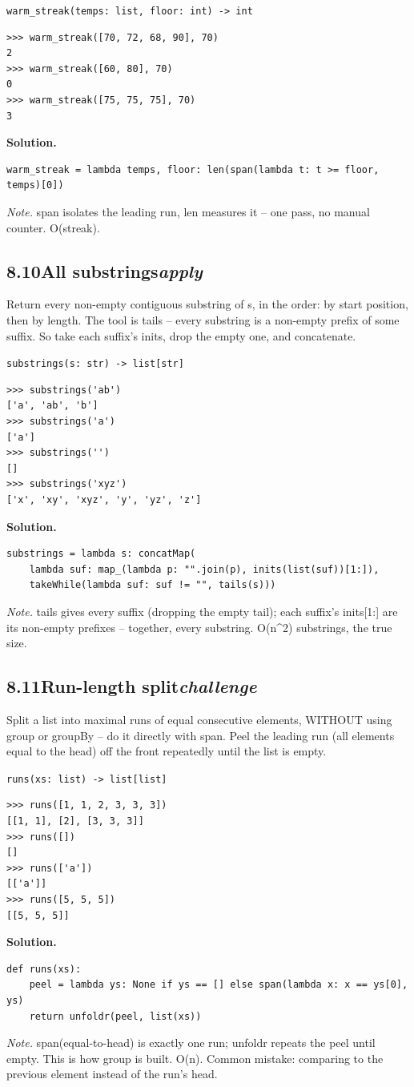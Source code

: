 \documentclass[10pt,letterpaper]{book}
\begin{document}
\noindent\texttt{warm\_streak(temps: list, floor: int) -> int}
\begin{lstlisting}[style=ex]
>>> warm_streak([70, 72, 68, 90], 70)
2
>>> warm_streak([60, 80], 70)
0
>>> warm_streak([75, 75, 75], 70)
3
\end{lstlisting}
\noindent\textbf{Solution.}
\begin{lstlisting}[style=code]
warm_streak = lambda temps, floor: len(span(lambda t: t >= floor, temps)[0])
\end{lstlisting}
\noindent\textit{Note.} span isolates the leading run, len measures it -- one pass, no manual counter. O(streak).

\subsection*{8.10\quad All substrings\hfill\textnormal{\textit{apply}}}
Return every non-empty contiguous substring of s, in the order: by start position, then by length. The tool is tails -- every substring is a non-empty prefix of some suffix. So take each suffix's inits, drop the empty one, and concatenate.

\noindent\texttt{substrings(s: str) -> list[str]}
\begin{lstlisting}[style=ex]
>>> substrings('ab')
['a', 'ab', 'b']
>>> substrings('a')
['a']
>>> substrings('')
[]
>>> substrings('xyz')
['x', 'xy', 'xyz', 'y', 'yz', 'z']
\end{lstlisting}
\noindent\textbf{Solution.}
\begin{lstlisting}[style=code]
substrings = lambda s: concatMap(
    lambda suf: map_(lambda p: "".join(p), inits(list(suf))[1:]),
    takeWhile(lambda suf: suf != "", tails(s)))
\end{lstlisting}
\noindent\textit{Note.} tails gives every suffix (dropping the empty tail); each suffix's inits[1:] are its non-empty prefixes -- together, every substring. O(n\^{}2) substrings, the true size.

\subsection*{8.11\quad Run-length split\hfill\textnormal{\textit{challenge}}}
Split a list into maximal runs of equal consecutive elements, WITHOUT using group or groupBy -- do it directly with span. Peel the leading run (all elements equal to the head) off the front repeatedly until the list is empty.

\noindent\texttt{runs(xs: list) -> list[list]}
\begin{lstlisting}[style=ex]
>>> runs([1, 1, 2, 3, 3, 3])
[[1, 1], [2], [3, 3, 3]]
>>> runs([])
[]
>>> runs(['a'])
[['a']]
>>> runs([5, 5, 5])
[[5, 5, 5]]
\end{lstlisting}
\noindent\textbf{Solution.}
\begin{lstlisting}[style=code]
def runs(xs):
    peel = lambda ys: None if ys == [] else span(lambda x: x == ys[0], ys)
    return unfoldr(peel, list(xs))
\end{lstlisting}
\noindent\textit{Note.} span(equal-to-head) is exactly one run; unfoldr repeats the peel until empty. This is how group is built. O(n). Common mistake: comparing to the previous element instead of the run's head.
\end{document}
